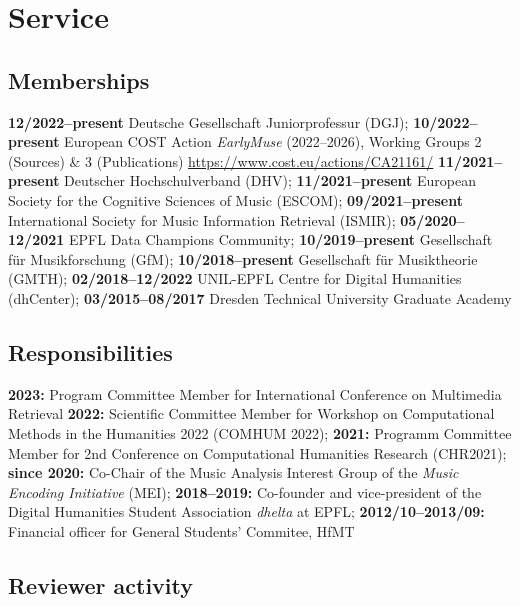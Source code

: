 \section{Service}

\subsection{Memberships}

\textbf{12/2022--present} Deutsche Gesellschaft Juniorprofessur (DGJ);
\textbf{10/2022--present} European COST Action \emph{EarlyMuse} (2022--2026), Working Groups 2 (Sources) \& 3 (Publications) \url{https://www.cost.eu/actions/CA21161/}
\textbf{11/2021--present} Deutscher Hochschulverband (DHV);
\textbf{11/2021--present} European Society for the Cognitive Sciences of Music (ESCOM);
\textbf{09/2021--present} International Society for Music Information Retrieval (ISMIR);
\textbf{05/2020--12/2021} EPFL Data Champions Community;
\textbf{10/2019--present} Gesellschaft f{\"u}r Musikforschung (GfM);
\textbf{10/2018--present} Gesellschaft f{\"u}r Musiktheorie (GMTH);
\textbf{02/2018--12/2022} UNIL-EPFL Centre for Digital Humanities (dhCenter);
\textbf{03/2015--08/2017} Dresden Technical University Graduate Academy

\subsection{Responsibilities}

\textbf{2023:} Program Committee Member for International Conference on Multimedia
Retrieval
\textbf{2022:} Scientific Committee Member for Workshop on Computational Methods in the Humanities 2022 (COMHUM 2022);
\textbf{2021:} Programm Committee Member for 2nd Conference on Computational Humanities Research (CHR2021);
\textbf{since 2020:} Co-Chair of the Music Analysis Interest Group of the \emph{Music Encoding Initiative} (MEI);
\textbf{2018--2019:} Co-founder and vice-president of the Digital Humanities Student Association \emph{dhelta} at EPFL;
\textbf{2012/10--2013/09:} Financial officer for General Students' Commitee, HfMT

\subsection{Reviewer activity}



